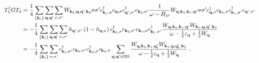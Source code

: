 \documentclass{revtex4-2}
\begin{document}
\begin{equation}\begin{aligned}
	T_5^\dagger G T_4 &= \frac{1}{4}\sum_{\left\{ {\bf k}_i \right\} }\sum_{{\bf q},{\bf q}^\prime}\sum_{\sigma,\sigma^\prime} W_{{\bf k}_3, {\bf q}, {\bf q}^\prime, {\bf k}_2} \sigma\sigma^\prime c^\dagger_{{\bf k}_3,\sigma}c_{{\bf q},\sigma}c^\dagger_{{\bf q}^\prime,\sigma^\prime}c_{{\bf k}_2,\sigma^\prime} \frac{1}{\omega - H_D}W_{{\bf q},{\bf k}_4, {\bf k}_1, {\bf q}^\prime} \sigma\sigma^\prime c^\dagger_{{\bf q},\sigma}c_{{\bf k}_4,\sigma}c^\dagger_{{\bf k}_1,\sigma^\prime}c_{{\bf q}^\prime,\sigma^\prime}\\
		  &= -\frac{1}{4}\sum_{\left\{ {\bf k}_i \right\} }\sum_{{\bf q},{\bf q}^\prime}\sum_{\sigma,\sigma^\prime} \hat n_{{\bf q}^\prime,\sigma^\prime} \left(1 - \hat n_{{\bf q},\sigma}\right) c^\dagger_{{\bf k}_3,\sigma}c_{{\bf k}_2,\sigma^\prime}c_{{\bf k}_4,\sigma} c^\dagger_{{\bf k}_1,\sigma^\prime} \frac{W_{{\bf q},{\bf k}_4, {\bf k}_1, {\bf q}^\prime} W_{{\bf k}_3, {\bf q}, {\bf q}^\prime, {\bf k}_2}}{\omega - \frac{1}{2}\varepsilon_{{\bf q}}  + \frac{1}{2}W_{{\bf q}}}  \\
		  &= -\frac{1}{4}\sum_{\left\{ {\bf k}_i \right\}}\sum_{\sigma,\sigma^\prime} c^\dagger_{{\bf k}_1,\sigma^\prime}c_{{\bf k}_2,\sigma^\prime}c^\dagger_{{\bf k}_3,\sigma} c_{{\bf k}_4,\sigma} \sum_{{\bf q}, {\bf q}^\prime \in \text{HS}}\frac{W_{{\bf q},{\bf k}_4, {\bf k}_1, {\bf q}_t^\prime} W_{{\bf k}_3, {\bf q}, {\bf q}_t^\prime, {\bf k}_2}}{\omega - \frac{1}{2}\varepsilon_{{\bf q}}  + \frac{1}{2}W_{{\bf q}}}~.
\end{aligned}\end{equation}
\end{document}
